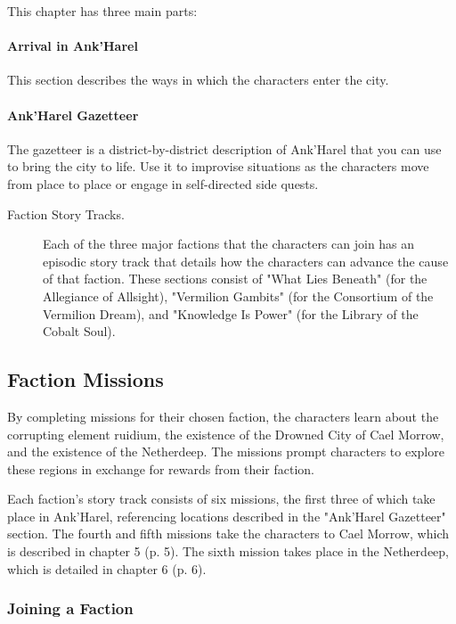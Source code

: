 \documentclass[letterpaper, 11pt, bg=full, twocolumn]{dndbook}
\begin{document}
This chapter has three main parts:

\paragraph{Arrival in Ank'Harel}

This section describes the ways in which the characters enter the city.

\paragraph{Ank'Harel Gazetteer}

The gazetteer is a district-by-district description of Ank'Harel that you can use to bring the city to life. Use it to improvise situations as the characters move from place to place or engage in self-directed side quests.

\begin{description}
\item[Faction Story Tracks.] Each of the three major factions that the characters can join has an episodic story track that details how the characters can advance the cause of that faction. These sections consist of "What Lies Beneath" (for the Allegiance of Allsight), "Vermilion Gambits" (for the Consortium of the Vermilion Dream), and "Knowledge Is Power" (for the Library of the Cobalt Soul).
\end{description}

\subsection{Faction Missions}

By completing missions for their chosen faction, the characters learn about the corrupting element ruidium, the existence of the Drowned City of Cael Morrow, and the existence of the Netherdeep. The missions prompt characters to explore these regions in exchange for rewards from their faction.

Each faction's story track consists of six missions, the first three of which take place in Ank'Harel, referencing locations described in the "Ank'Harel Gazetteer" section. The fourth and fifth missions take the characters to Cael Morrow, which is described in chapter 5 (p. 5). The sixth mission takes place in the Netherdeep, which is detailed in chapter 6 (p. 6).

\subsubsection{Joining a Faction}
\end{document}
